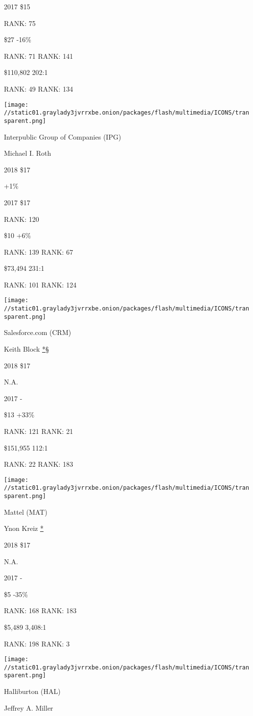 2017 \$15

RANK: 75

 \$27 -16\%

RANK: 71 RANK: 141

 \$110,802 202:1

RANK: 49 RANK: 134

\texttt{[image: //static01.graylady3jvrrxbe.onion/packages/flash/multimedia/ICONS/transparent.png]}

Interpublic Group of Companies (IPG)

Michael I. Roth \protect\hyperlink{g-footnotes}{}

2018 \$17

 +1\%

2017 \$17

RANK: 120

 \$10 +6\%

RANK: 139 RANK: 67

 \$73,494 231:1

RANK: 101 RANK: 124

\texttt{[image: //static01.graylady3jvrrxbe.onion/packages/flash/multimedia/ICONS/transparent.png]}

Salesforce.com (CRM)

Keith Block \protect\hyperlink{g-footnotes}{*§}

2018 \$17

 N.A.

2017 -

 \$13 +33\%

RANK: 121 RANK: 21

 \$151,955 112:1

RANK: 22 RANK: 183

\texttt{[image: //static01.graylady3jvrrxbe.onion/packages/flash/multimedia/ICONS/transparent.png]}

Mattel (MAT)

Ynon Kreiz \protect\hyperlink{g-footnotes}{*}

2018 \$17

 N.A.

2017 -

 \$5 -35\%

RANK: 168 RANK: 183

 \$5,489 3,408:1

RANK: 198 RANK: 3

\texttt{[image: //static01.graylady3jvrrxbe.onion/packages/flash/multimedia/ICONS/transparent.png]}

Halliburton (HAL)

Jeffrey A. Miller \protect\hyperlink{g-footnotes}{}

